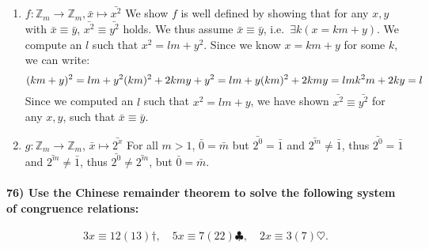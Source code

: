 \documentclass[
]{article}
\begin{document}
\begin{enumerate}
\def\labelenumi{\alph{enumi})}
\item
  \(f : \mathbb{Z}_m \rightarrow \mathbb{Z}_m, \bar x \mapsto \bar{x^2}\)
  We show \(f\) is well defined by showing that for any \(x,y\) with
  \(\bar x \equiv \bar y\), \(\bar{x^2} \equiv \bar{y^2}\) holds. We
  thus assume \(\bar x \equiv \bar y\), i.e.~\(\exists k (x = km +y)\).
  We compute an \(l\) such that \(x^2 = lm + y^2\). Since we know
  \(x = km +y\) for some \(k\), we can write: \[
   (km + y)^2 = lm +y^2\\
   (km)^2 + 2kmy + y^2 = lm +y \\
   (km)^2 + 2kmy = lm \\
   k^2m+2ky = l
   \] Since we computed an \(l\) such that \(x^2 = lm+y\), we have shown
  \(\bar{x^2} \equiv \bar{y^2}\) for any \(x,y\), such that
  \(\bar x \equiv \bar y\).
\item
  \(g: \mathbb{Z}_m \rightarrow \mathbb{Z}_m\),
  \(\bar x \mapsto \bar{2^x}\) For all \(m > 1\), \(\bar0 = \bar m\) but
  \(\bar{2^0} = \bar 1\) and \(\bar{2^m} \neq \bar 1\), thus
  \(\bar{2^0} = \bar 1\) and \(\bar{2^m} \neq \bar 1\), thus
  \(\bar{2^0} \neq \bar{2^m}\), but \(\bar0 = \bar m\).
\end{enumerate}

\hypertarget{use-the-chinese-remainder-theorem-to-solve-the-following-system-of-congruence-relations}{%
\paragraph{76) Use the Chinese remainder theorem to solve the following
system of congruence
relations:}\label{use-the-chinese-remainder-theorem-to-solve-the-following-system-of-congruence-relations}}

\[
3x \equiv 12(13) \mathit{\dagger}, \quad 5x \equiv 7(22)\clubsuit, \quad 2x \equiv 3 (7) \heartsuit.
\]
\end{document}
